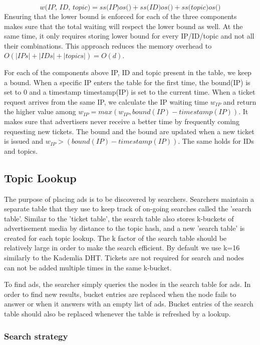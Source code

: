 \begin{equation}
    \textit{w(IP, ID, topic)} = 
    \textit{ss(IP)}\textit{os()} + 
    \textit{ss(ID)}\textit{os()} + 
    \textit{ss(topic)}\textit{os()}
\end{equation}
Ensuring that the lower bound is enforced for each of the three components makes sure that the total waiting will respect the lower bound as well. At the same time, it only requires storing lower bound for every IP/ID/topic and not all their combinations. This approach reduces the memory overhead to $O(|IPs|+|IDs|+|topics|) = O(d)$.

For each of the components above IP, ID and topic present in the table, we keep a bound. When a specific IP enters the table for the first time, the bound(IP) is set to 0 and a timestamp timestamp(IP) is set to the current time. When a ticket request arrives from the same IP, we calculate the IP waiting time $w_{IP}$ and return the higher value among $w_{IP} = max(w_{IP}, bound(IP) - timestamp(IP))$. It makes sure that advertisers never receive a better time by frequently coming requesting new tickets. The bound and the bound are updated when a new ticket is issued and $w_{IP} > (bound(IP) - timestamp(IP))$. The same holds for IDs and topics.




\subsection{Topic Lookup}
The purpose of placing ads is to be discovered by searchers. Searchers maintain a separate table that they use to keep track of on-going searches called the 'search table'. Similar to the 'ticket table', the search table also stores k-buckets of advertisement media by distance to the topic hash, and a new 'search table' is created for each topic lookup. The k factor of the search table should be relatively large in order to make the search efficient. By default we use k=16 similarly to the Kademlia DHT. Tickets are not required for search and nodes can not be added multiple times in the same k-bucket.

To find ads, the searcher simply queries the nodes in the search table for ads. In order to find new results, bucket entries are replaced when the node fails to answer or when it answers with an empty list of ads. Bucket entries of the search table should also be replaced whenever the table is refreshed by a lookup.

\subsubsection{Search strategy}

